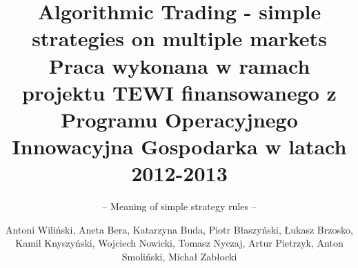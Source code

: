 \documentclass[envcountsame,envcountchap]{svmono}
\begin{document}
\author{Antoni Wiliński, Aneta Bera, Katarzyna Buda, Piotr Błaszyński, Łukasz Brzosko, Kamil Knyszyński, Wojciech Nowicki, Tomasz Nyczaj, Artur Pietrzyk, Anton Smoliński, Michał Zabłocki}
\title{Algorithmic Trading - simple strategies on multiple markets\\
{\small Praca wykonana w ramach projektu TEWI finansowanego z Programu Operacyjnego Innowacyjna Gospodarka w latach 2012-2013}}
\subtitle{-- Meaning of simple strategy rules --}
\maketitle

\frontmatter%

%
%

\tableofcontents


\mainmatter%





%

\backmatter%
%

\printindex

\end{document}
